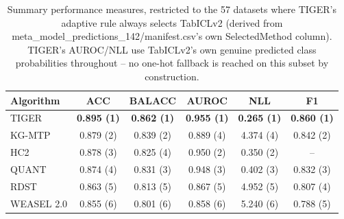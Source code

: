 \begin{table}[t]
\centering
\begin{tabular}{lccccc}
\toprule
Algorithm & ACC & BALACC & AUROC & NLL & F1 \\
\midrule
TIGER & \textbf{0.895 (1)} & \textbf{0.862 (1)} & \textbf{0.955 (1)} & \textbf{0.265 (1)} & \textbf{0.860 (1)} \\
KG-MTP & 0.879 (2) & 0.839 (2) & 0.889 (4) & 4.374 (4) & 0.842 (2) \\
HC2 & 0.878 (3) & 0.825 (4) & 0.950 (2) & 0.350 (2) & -- \\
QUANT & 0.874 (4) & 0.831 (3) & 0.948 (3) & 0.402 (3) & 0.832 (3) \\
RDST & 0.863 (5) & 0.813 (5) & 0.867 (5) & 4.952 (5) & 0.807 (4) \\
WEASEL 2.0 & 0.855 (6) & 0.801 (6) & 0.858 (6) & 5.240 (6) & 0.788 (5) \\
\bottomrule
\end{tabular}
\caption{Summary performance measures, restricted to the 57 datasets where TIGER's adaptive rule always selects TabICLv2 (derived from meta_model_predictions_142/manifest.csv's own SelectedMethod column). TIGER's AUROC/NLL use TabICLv2's own genuine predicted class probabilities throughout -- no one-hot fallback is reached on this subset by construction.}
\label{tab:multi_metric_tabiclv2_subset}
\end{table}